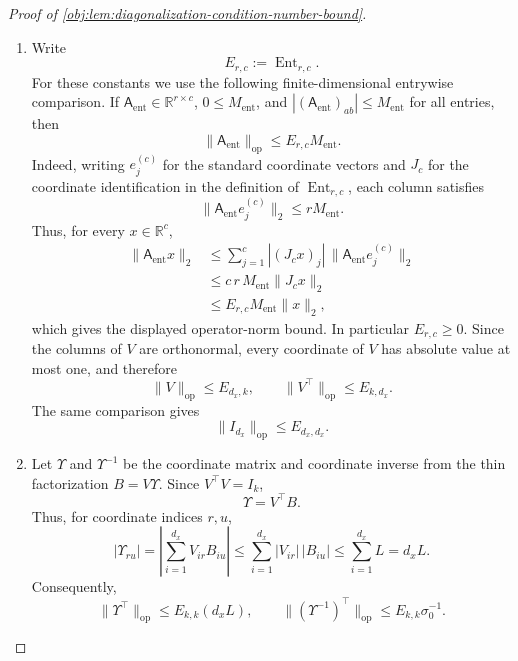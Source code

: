 \begin{proof}[Proof of \cref{obj:lem:diagonalization-condition-number-bound}]
\begin{enumerate}
\item Write
\[
E_{r,c}:=\operatorname{Ent}_{r,c}.
\]
For these constants we use the following finite-dimensional entrywise comparison. If \(\mathsf A_{\mathrm{ent}}\in\mathbb R^{r\times c}\), \(0\le M_{\mathrm{ent}}\), and \(|(\mathsf A_{\mathrm{ent}})_{ab}|\le M_{\mathrm{ent}}\) for all entries, then
\[
\|\mathsf A_{\mathrm{ent}}\|_{\mathrm{op}}\le E_{r,c}M_{\mathrm{ent}} .
\]
Indeed, writing \(e_j^{(c)}\) for the standard coordinate vectors and \(J_c\) for the coordinate identification in the definition of \(\operatorname{Ent}_{r,c}\), each column satisfies
\[
\|\mathsf A_{\mathrm{ent}}e_j^{(c)}\|_2\le rM_{\mathrm{ent}} .
\]
Thus, for every \(x\in\mathbb R^c\),
\[
\begin{aligned}
\|\mathsf A_{\mathrm{ent}}x\|_2
&\le \sum_{j=1}^c |(J_cx)_j|\,\|\mathsf A_{\mathrm{ent}}e_j^{(c)}\|_2 \\
&\le c\,r\,M_{\mathrm{ent}}\|J_cx\|_2 \\
&\le E_{r,c}M_{\mathrm{ent}}\|x\|_2,
\end{aligned}
\]
which gives the displayed operator-norm bound. In particular \(E_{r,c}\ge0\). Since the columns of \(V\) are orthonormal, every coordinate of \(V\) has absolute value at most one, and therefore
\[
\|V\|_{\mathrm{op}}\le E_{d_x,k},
\qquad
\|V^\top\|_{\mathrm{op}}\le E_{k,d_x}.
\]
The same comparison gives
\[
\|I_{d_x}\|_{\mathrm{op}}\le E_{d_x,d_x}.
\]

\item Let \(\Upsilon\) and \(\Upsilon^{-1}\) be the coordinate matrix and coordinate inverse from the thin factorization \(B=V\Upsilon\). Since \(V^\top V=I_k\),
\[
\Upsilon=V^\top B .
\]
Thus, for coordinate indices \(r,u\),
\[
|\Upsilon_{ru}|
=
\left|\sum_{i=1}^{d_x}V_{ir}B_{iu}\right|
\le
\sum_{i=1}^{d_x}|V_{ir}|\,|B_{iu}|
\le
\sum_{i=1}^{d_x}L
=
d_xL .
\]
Consequently,
\[
\|\Upsilon^\top\|_{\mathrm{op}}\le E_{k,k}(d_xL),
\qquad
\|(\Upsilon^{-1})^\top\|_{\mathrm{op}}\le E_{k,k}\sigma_0^{-1}.
\]


\end{enumerate}
\end{proof}
